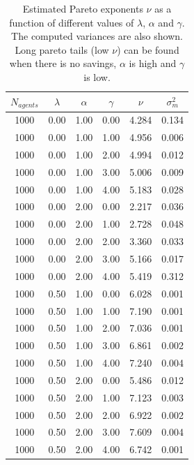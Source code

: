 \documentclass[11pt,a4paper,titlepage]{article}
\begin{document}
\begin{table}[ht!]
\centering
\caption{Estimated Pareto exponents $\nu$ as a function of different values of  $\lambda$, $\alpha$ and $\gamma$. The computed variances are also shown. Long pareto tails (low $\nu$) can be found when there is no savings, $\alpha$ is high and $\gamma$ is low.} \label{tab:gamma}
\begin{tabular}{| c | c | c | c | c | c |} \hline
\textbf{$N_{agents}$} & $\lambda$ & $\alpha$ & $\gamma$ &  $\nu$ & $\sigma^2_m$\\ \hline
1000 & 0.00 & 1.00 & 0.00 & 4.284 & 0.134 \\ \hline
1000 & 0.00 & 1.00 & 1.00 & 4.956 & 0.006 \\ \hline
1000 & 0.00 & 1.00 & 2.00 & 4.994 & 0.012 \\ \hline
1000 & 0.00 & 1.00 & 3.00 & 5.006 & 0.009 \\ \hline
1000 & 0.00 & 1.00 & 4.00 & 5.183 & 0.028 \\ \hline

1000 & 0.00 & 2.00 & 0.00 & 2.217 & 0.036 \\ \hline
1000 & 0.00 & 2.00 & 1.00 & 2.728 & 0.048 \\ \hline
1000 & 0.00 & 2.00 & 2.00 & 3.360 & 0.033 \\ \hline
1000 & 0.00 & 2.00 & 3.00 & 5.166 & 0.017 \\ \hline
1000 & 0.00 & 2.00 & 4.00 & 5.419 & 0.312 \\ \hline

1000 & 0.50 & 1.00 & 0.00 & 6.028 & 0.001 \\ \hline
1000 & 0.50 & 1.00 & 1.00 & 7.190 & 0.001 \\ \hline
1000 & 0.50 & 1.00 & 2.00 & 7.036 & 0.001 \\ \hline
1000 & 0.50 & 1.00 & 3.00 & 6.861 & 0.002 \\ \hline
1000 & 0.50 & 1.00 & 4.00 & 7.240 & 0.004 \\ \hline

1000 & 0.50 & 2.00 & 0.00 & 5.486 & 0.012 \\ \hline
1000 & 0.50 & 2.00 & 1.00 & 7.123 & 0.003 \\ \hline
1000 & 0.50 & 2.00 & 2.00 & 6.922 & 0.002 \\ \hline
1000 & 0.50 & 2.00 & 3.00 & 7.609 & 0.004 \\ \hline
1000 & 0.50 & 2.00 & 4.00 & 6.742 & 0.001 \\ \hline

\end{tabular}
\end{table}
\end{document}

